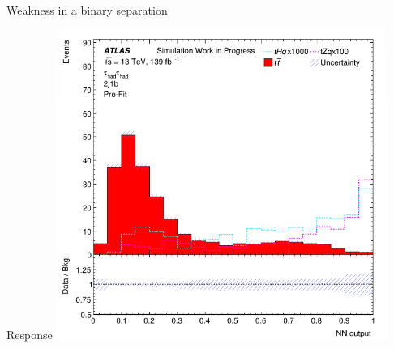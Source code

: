 \begin{frame}
    \begin{center}
        \Huge \tZq \\ Weakness in a binary separation
    \end{center}
\end{frame}

\begin{frame}{Response}
    \centering \includegraphics[width=0.81\textwidth]{tZq_problem}
\end{frame}